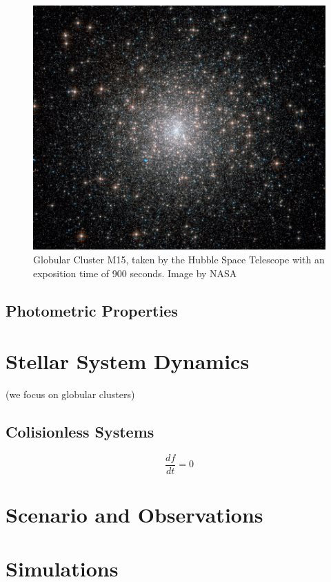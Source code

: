 \begin{figure}[H]
\centering
\includegraphics[width=12cm]{images/m15.jpg}
\caption{Globular Cluster M15, taken by the Hubble Space Telescope with an exposition time of 900 seconds. Image by NASA}
\end{figure}



\subsection{Photometric Properties}

\section{Stellar System Dynamics}

(we focus on globular clusters)

\subsection{Colisionless Systems}

\begin{equation}
\dfrac{df}{dt}=0
\end{equation}


\section{Scenario and Observations}

\section{Simulations}
